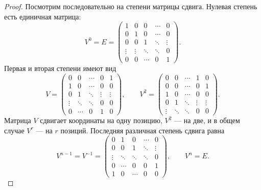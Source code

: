 \documentclass[12pt,a4paper]{article}
\theoremstyle{definition}
\theoremstyle{remark}
\begin{document}
\begin{proof}
Посмотрим последовательно на степени матрицы сдвига. Нулевая степень есть
единичная матрица:
\[
  V^0=E=
  \begin{pmatrix}
    1&0&0&\cdots&0\\
    0&1&0&\cdots&0\\
    0&0&1&\ddots&\vdots\\
    \vdots&\vdots&\ddots&\ddots&0\\
    0&0&\cdots&0&1
  \end{pmatrix}.
\]
Первая и вторая степени имеют вид
\[
  V=
  \begin{pmatrix}
    0&0&\cdots&0&1\\
    1&0&\cdots&0&0\\
    0&1&\ddots&\vdots&\vdots\\
    \vdots&\ddots&\ddots&0&0\\
    0&\cdots&0&1&0
  \end{pmatrix},
  \qquad
  V^2=
  \begin{pmatrix}
    0&0&\cdots&1&0\\
    0&0&\cdots&0&1\\
    1&0&\cdots&0&0\\
    0&1&\ddots&\vdots&\vdots\\
    \vdots&\ddots&\ddots&0&0
  \end{pmatrix}.
\]
Матрица $V$ сдвигает координаты на одну позицию, $V^2$ --- на две, и в
общем случае $V^r$ --- на $r$ позиций. Последняя различная степень сдвига
равна
\[
  V^{n-1}=V^{-1}=
  \begin{pmatrix}
    0&1&0&\cdots&0\\
    0&0&1&\ddots&\vdots\\
    \vdots&\ddots&\ddots&\ddots&0\\
    0&\cdots&0&0&1\\
    1&0&\cdots&0&0
  \end{pmatrix},
  \qquad V^n=E.
\]


\end{proof}
\end{document}
